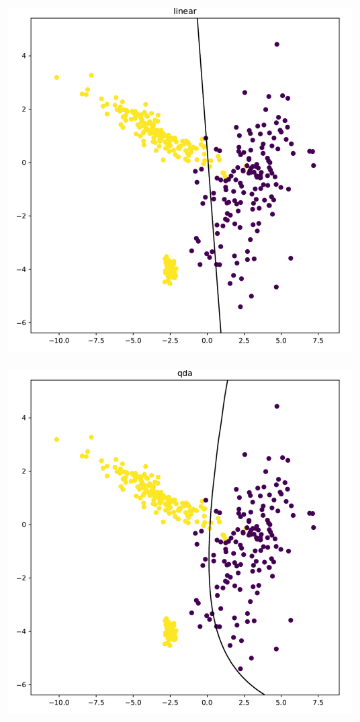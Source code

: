 \documentclass[9pt, oneside]{amsart}   	%
\begin{document}
\begin{figure}[t!]
\begin{subfigure}{.45\textwidth}
\end{subfigure}
\\[+5pt]
\begin{subfigure}{.45\textwidth}
  \centering
  \includegraphics[width=\linewidth]{classificationC_linear.pdf}
\end{subfigure} \hspace{5pt}
\begin{subfigure}{.45\textwidth}
  \centering
  \includegraphics[width=\linewidth]{classificationC_qda.pdf}
\end{subfigure}
\end{figure}
\end{document}
